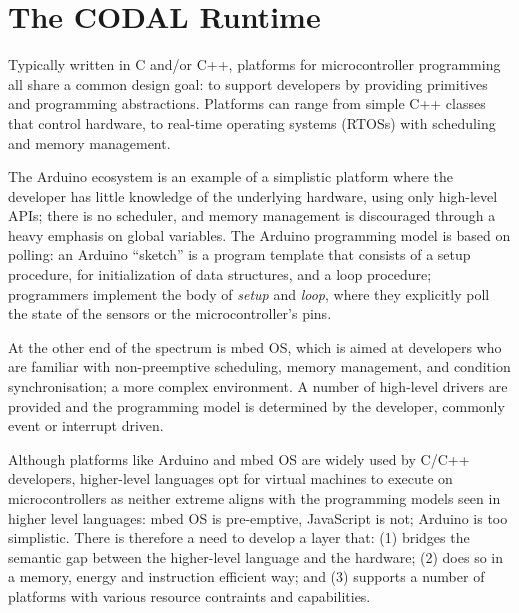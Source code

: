 \section{The CODAL Runtime}
\label{sec:codal}



Typically written in C and/or C++, platforms for microcontroller programming all share a common design goal: to support developers by providing primitives and programming abstractions. Platforms can range from simple C++ classes that control hardware, to real-time operating systems (RTOSs) with scheduling and memory management.

The Arduino ecosystem is an example of a simplistic platform where the developer has little knowledge of the underlying hardware, using only high-level APIs; there is no scheduler, and memory management is discouraged through a heavy emphasis on global variables.  The Arduino programming model is based on polling: an Arduino ``sketch'' is a program template that consists of a setup procedure, for initialization of data structures, and a loop procedure; programmers implement the body of \textit{setup} and \textit{loop}, where they explicitly poll the state of the sensors or the microcontroller's pins.

At the other end of the spectrum is mbed OS, which is aimed at developers who are familiar with non-preemptive scheduling, memory management, and condition synchronisation; a more complex environment. A number of high-level drivers are provided and the programming model is determined by the developer, commonly event or interrupt driven.

Although platforms like Arduino and mbed OS are widely used by C/C++ developers, higher-level languages opt for virtual machines to execute on microcontrollers as neither extreme aligns with the programming models seen in higher level languages: mbed OS is pre-emptive, JavaScript is not; Arduino is too simplistic. There is therefore a need to develop a layer that: (1) bridges the semantic gap between the higher-level language and the hardware; (2) does so in a memory, energy and instruction efficient way; and (3) supports a number of platforms with various resource contraints and capabilities.

